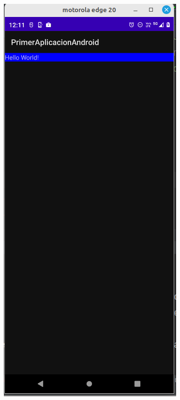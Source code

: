 \begin{frame}[fragile]
\begin{columns}
\begin{center}
\includegraphics[width=0.95\linewidth]{01_Modificacion/App_Version2.png}    
\end{center}
\end{columns}
\end{frame}
